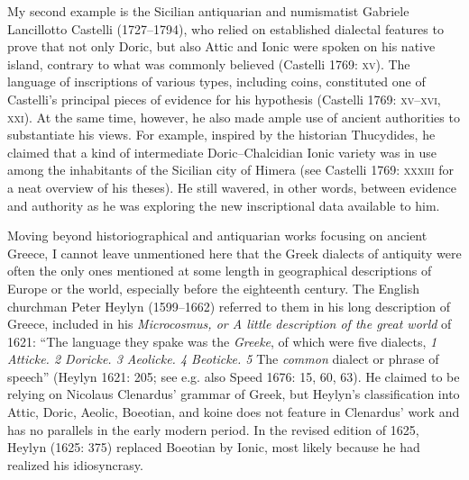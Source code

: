 \begin{styleStandard}
My second example is the Sicilian antiquarian and numismatist Gabriele Lancillotto Castelli (1727–1794), who relied on established dialectal features to prove that not only Doric, but also Attic and Ionic were spoken on his native island, contrary to what was commonly believed (Castelli 1769: \textsc{xv}). The language of inscriptions of various types, including coins, constituted one of Castelli’s principal pieces of evidence for his hypothesis (Castelli 1769: \textsc{xv–xvi, xxi}). At the same time, however, he also made ample use of ancient authorities to substantiate his views. For example, inspired by the historian Thucydides, he claimed that a kind of intermediate Doric–Chalcidian Ionic variety was in use among the inhabitants of the Sicilian city of Himera (see Castelli 1769: \textsc{xxxiii} for a neat overview of his theses). He still wavered, in other words, between evidence and authority as he was exploring the new inscriptional data available to him.
\end{styleStandard}

\begin{styleStandard}
Moving beyond historiographical and antiquarian works focusing on ancient Greece, I cannot leave unmentioned here that the Greek dialects of antiquity were often the only ones mentioned at some length in geographical descriptions of Europe or the world, especially before the eighteenth century. The English churchman Peter Heylyn (1599–1662) referred to them in his long description of Greece, included in his \textit{Microcosmus, or A little description of the great world} of 1621: “The language they spake was the \textit{Greeke}, of which were five dialects, \textit{1 Atticke. 2 Doricke. 3 Aeolicke. 4 Beoticke. 5} The \textit{common} dialect or phrase of speech” (Heylyn 1621: 205; see e.g. also Speed 1676: 15, 60, 63). He claimed to be relying on Nicolaus Clenardus’ grammar of Greek, but Heylyn’s classification into Attic, Doric, Aeolic, Boeotian, and koine does not feature in Clenardus’ work and has no parallels in the early modern period. In the revised edition of 1625, Heylyn (1625: 375) replaced Boeotian by Ionic, most likely because he had realized his idiosyncrasy.
\end{styleStandard}

